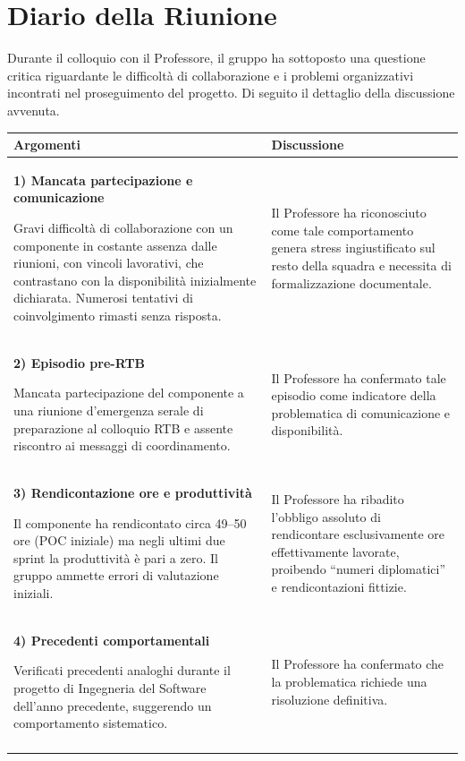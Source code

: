 \documentclass[a4paper, 11pt, oneside]{scrartcl} %
\begin{document}
\newpage
\section{Diario della Riunione}

Durante il colloquio con il Professore, il gruppo ha sottoposto una questione critica riguardante le difficoltà di collaborazione e i problemi organizzativi incontrati nel proseguimento del progetto. Di seguito il dettaglio della discussione avvenuta.

\vspace{0.5cm}
\footnotesize
\setlength{\tabcolsep}{5pt}
\begin{tabularx}{\textwidth}{p{} p{}}
\toprule
\textbf{Argomenti} & \textbf{Discussione} \\
\midrule

\textbf{1) Mancata partecipazione e comunicazione} \par
Gravi difficoltà di collaborazione con un componente in costante assenza dalle riunioni, con vincoli lavorativi, che contrastano con la disponibilità inizialmente dichiarata. Numerosi tentativi di coinvolgimento rimasti senza risposta.
&
Il Professore ha riconosciuto come tale comportamento genera stress ingiustificato sul resto della squadra e necessita di formalizzazione documentale.\\ \addlinespace

\textbf{2) Episodio pre-RTB} \par
Mancata partecipazione del componente a una riunione d'emergenza serale di preparazione al colloquio RTB e assente riscontro ai messaggi di coordinamento.
&
Il Professore ha confermato tale episodio come indicatore della problematica di comunicazione e disponibilità.\\ \addlinespace

\textbf{3) Rendicontazione ore e produttività} \par
Il componente ha rendicontato circa 49--50 ore (POC iniziale) ma negli ultimi due sprint la produttività è pari a zero. Il gruppo ammette errori di valutazione iniziali.
&
Il Professore ha ribadito l'obbligo assoluto di rendicontare esclusivamente ore effettivamente lavorate, proibendo ``numeri diplomatici'' e rendicontazioni fittizie.\\ \addlinespace

\textbf{4) Precedenti comportamentali} \par
Verificati precedenti analoghi durante il progetto di Ingegneria del Software dell'anno precedente, suggerendo un comportamento sistematico.
&
Il Professore ha confermato che la problematica richiede una risoluzione definitiva.\\ \addlinespace

\bottomrule
\end{tabularx}
\normalsize
\end{document}
